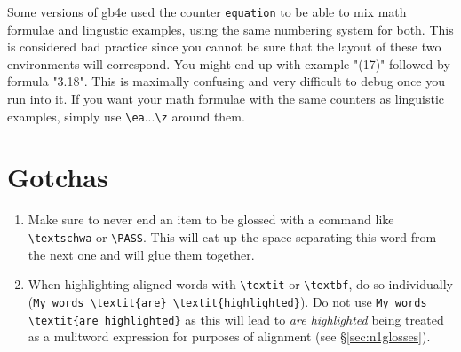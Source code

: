 \documentclass[output=paper]{langscibook}
\newcommand{\cmd}[1]{\texttt{\textbackslash#1}}
\begin{document}
Some versions of gb4e used the counter \texttt{equation} to be able to mix math formulae and lingustic examples, using the same numbering system for both. This is considered bad practice since you cannot be sure that the layout of these two environments will correspond. You might end up with example "(17)" followed by formula "3.18". This is maximally confusing and very difficult to debug once you run into it. If you want your math formulae with the same counters as linguistic examples, simply use \cmd{ea}...\cmd{z} around them. 

\section{Gotchas}
\begin{enumerate}
\item Make sure to never end an item to be glossed with a command like \cmd{textschwa} or \cmd{PASS}. This will eat up the space separating this word from the next one and will glue them together. 
\item When highlighting aligned words with \cmd{textit} or \cmd{textbf}, do so individually (\verb+My words \textit{are} \textit{highlighted}+). Do not use \verb+My words+ \verb+\textit{are highlighted}+ as this will lead to \textit{are highlighted} being treated as a mulitword expression for purposes of alignment (see §\ref{sec:n1glosses}).
\end{enumerate}
 
\end{document}
